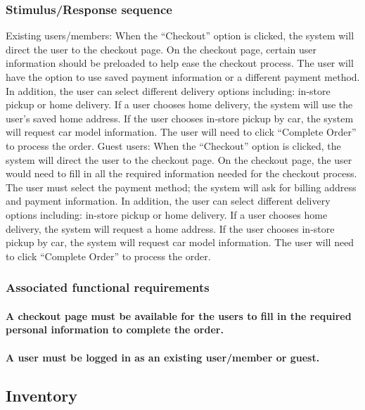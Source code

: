 \documentclass{scrreprt}
\begin{document}
\subsubsection{Stimulus/Response sequence}
Existing users/members:
When the “Checkout” option is clicked, the system will direct the user to the checkout page. On the checkout page, certain user information should be preloaded to help ease the checkout process. The user will have the option to use saved payment information or a different payment method. In addition, the user can select different delivery options including: in-store pickup or home delivery. If a user chooses home delivery, the system will use the user's saved home address. If the user chooses in-store pickup by car, the system will request car model information. The user will need to click “Complete Order” to process the order.
Guest users: 
When the “Checkout” option is clicked, the system will direct the user to the checkout page. On the checkout page, the user would need to fill in all the required information needed for the checkout process. The user must select the payment method; the system will ask for billing address and payment information. In addition, the user can select different delivery options including: in-store pickup or home delivery. If a user chooses home delivery, the system will request a home address. If the user chooses in-store pickup by car, the system will request car model information. The user will need to click “Complete Order” to process the order.


\subsubsection{Associated functional requirements}
\paragraph[]{\normalfont A checkout page must be available for the users to fill in the required personal information to complete the order.}
\paragraph[]{\normalfont A user must be logged in as an existing user/member or guest.}

\subsection{Inventory}
\end{document}
